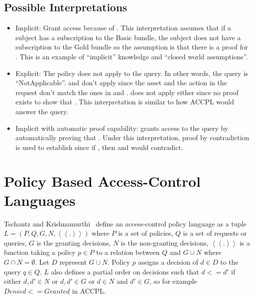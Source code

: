 \subsection{Possible Interpretations}\label{sec:threeinterpretations}
\begin{itemize}
\item Implicit: Grant access because of . This interpretation assumes that if a subject has a subscription to the Basic bundle, the subject does not have a subscription to the Gold bundle so the assumption is that there is a proof for . This is an example of ``implicit'' knowledge and ``closed world assumptions''.

\item Explicit: The policy does not apply to the query. In other words, the query is ``NotApplicable''.  and  don't apply since the asset and the action in the request don't match the ones in  and .  does not apply either since no proof exists to show that . This interpretation is similar to how \ac{ACCPL} would answer the query.

\item Implicit with automatic proof capability: grants access to the query by automatically proving that . Under this interpretation, proof by contradiction is used to establish  since if , then  and  would contradict.
\end{itemize}

\section{Policy Based Access-Control Languages}

Tschantz and Krishnamurthi~\cite{Tschantz} define an access-control policy language as a tuple $L = (P, Q, G, N, \left\langle\left\langle . \right\rangle\right\rangle)$ where $P$ is a set of policies, $Q$ is a set of requests or queries, $G$ is the granting decisions, $N$ is the non-granting decisions, $\left\langle\left\langle . \right\rangle\right\rangle$ is a function taking a policy $p \in P$ to a relation between $Q$ and $G \cup N$ where $G \cap N = \emptyset$. Let $D$ represent $G \cup N$. Policy $p$ assigns a decision of $d \in D$ to the query $q \in Q$. $L$ also defines a partial order on decisions such that $d <= d'$ if either $d, d' \in N$ or $d, d' \in G$ or $d \in N$ and $d' \in G$, so for example $Denied <= Granted$ in \ac{ACCPL}.

